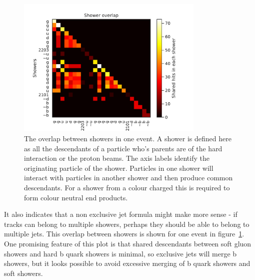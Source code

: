 \begin{figure}
    \centering
    \includegraphics[width=0.8\textwidth]{images/prog_showerOverlap.pdf}
    \caption{The overlap between showers in one event. A shower is defined here as all the descendants of a particle who's parents are of the hard interaction or the proton beams.
            The axis labels identify the originating particle of the shower.
         Particles in one shower will interact with particles in another shower and then produce common descendants.
         For a shower from a colour charged this is required to form 
     colour neutral end products.}
    \label{fig:prog_showerOverlap}
\end{figure}

It also indicates that a non exclusive jet formula might make more sense - if tracks can belong to multiple showers, perhaps they should be able to belong to multiple jets.
This overlap between showers is shown for one event in figure~\ref{fig:prog_showerOverlap}.
One promising feature of this plot is that shared descendants between soft gluon showers and hard b quark showers is minimal,
so exclusive jets will merge b showers, but it looks possible to avoid excessive merging of b quark showers and soft showers.


